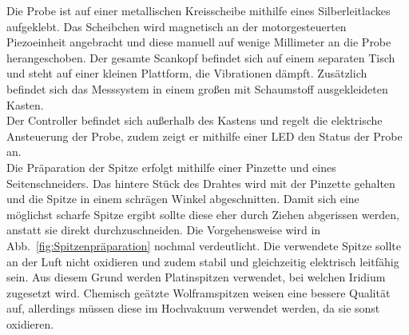 \documentclass[a4paper,twoside,final]{article}
\begin{document}
Die Probe ist auf einer metallischen Kreisscheibe mithilfe eines Silberleitlackes aufgeklebt. Das Scheibchen wird magnetisch an der motorgesteuerten Piezoeinheit angebracht und diese manuell auf wenige Millimeter an die Probe herangeschoben.
Der gesamte Scankopf befindet sich auf einem separaten Tisch und steht auf einer kleinen Plattform, die Vibrationen dämpft. Zusätzlich befindet sich das Messsystem in einem großen mit Schaumstoff ausgekleideten Kasten.\\
Der Controller befindet sich außerhalb des Kastens und regelt die elektrische Ansteuerung der Probe, zudem zeigt er mithilfe einer LED den Status der Probe an.\\
Die Präparation der Spitze erfolgt mithilfe einer Pinzette und eines Seitenschneiders. Das hintere Stück des Drahtes wird mit der Pinzette gehalten und die Spitze in einem schrägen Winkel abgeschnitten. Damit sich eine möglichst scharfe Spitze ergibt sollte diese eher durch Ziehen abgerissen werden, anstatt sie direkt durchzuschneiden. Die Vorgehensweise wird in Abb.~\ref{fig:Spitzenpräparation} nochmal verdeutlicht. Die verwendete Spitze sollte an der Luft nicht oxidieren und zudem stabil und gleichzeitig elektrisch leitfähig sein. Aus diesem Grund werden Platinspitzen verwendet, bei welchen Iridium zugesetzt wird. Chemisch geätzte Wolframspitzen weisen eine bessere Qualität auf, allerdings müssen diese im Hochvakuum verwendet werden, da sie sonst oxidieren.
\end{document}
